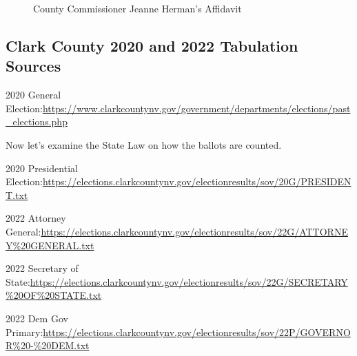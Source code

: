 \begin{figure}[bp!]
\caption{County Commissioner Jeanne Herman's Affidavit}
    \centering
\end{figure}

\newpage
\subsection{Clark County 2020 and 2022 Tabulation Sources}
2020 General Election:\url{https://www.clarkcountynv.gov/government/departments/elections/past_elections.php}

Now let's examine the State Law on how the ballots are counted.

2020 Presidential Election:\url{https://elections.clarkcountynv.gov/electionresults/sov/20G/PRESIDENT.txt}

2022 Attorney General:\url{https://elections.clarkcountynv.gov/electionresults/sov/22G/ATTORNEY%20GENERAL.txt}

2022 Secretary of State:\url{https://elections.clarkcountynv.gov/electionresults/sov/22G/SECRETARY%20OF%20STATE.txt}

2022 Dem Gov Primary:\url{https://elections.clarkcountynv.gov/electionresults/sov/22P/GOVERNOR%20-%20DEM.txt}

